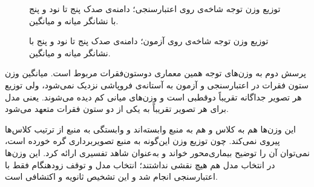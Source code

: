 \begin{figure}[htbp]
  \centering
  \caption{توزیع وزن توجه شاخه‌ی  روی اعتبارسنجی؛ دامنه‌ی صدک پنج تا نود و پنج با نشانگر میانه و میانگین.}
  \label{fig:U24}
\end{figure}

\begin{figure}[htbp]
  \centering
  \caption{توزیع وزن توجه شاخه‌ی  روی آزمون؛ دامنه‌ی صدک پنج تا نود و پنج با نشانگر میانه و میانگین.}
  
\end{figure}


پرسش دوم به وزن‌های توجه همین معماری دو‌ستون‌فقرات مربوط است. میانگین وزن ستون فقرات  در اعتبارسنجی و آزمون به آستانه‌ی فروپاشی نزدیک نمی‌شود، ولی توزیع هر تصویر جداگانه تقریباً دوقطبی است و وزن‌های میانی کم دیده می‌شوند. یعنی مدل برای هر تصویر تقریباً به یکی از دو ستون فقرات متعهد می‌شود.

این وزن‌ها هم به کلاس و هم به منبع وابسته‌اند و وابستگی به منبع از ترتیب کلاس‌ها پیروی نمی‌کند. چون توزیع وزن این‌گونه به منبع تصویربرداری گره خورده است، نمی‌توان آن را توضیح بیماری‌محور خواند و به‌عنوان شاهد تفسیری ارائه کرد. این وزن‌ها در انتخاب مدل هم هیچ نقشی نداشتند؛ انتخاب مدل و توقف زودهنگام فقط با اعتبارسنجی انجام شد و این تشخیص ثانویه و اکتشافی است.




